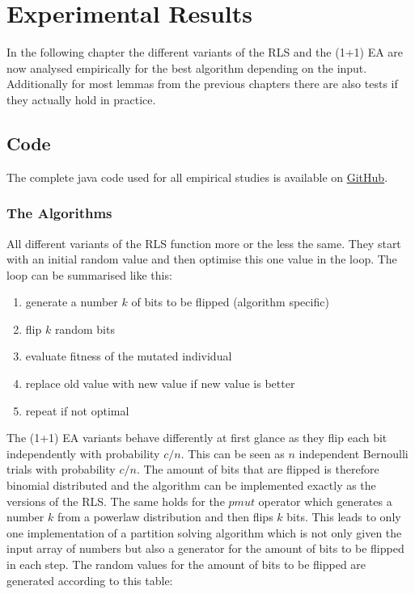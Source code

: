 \chapter{Experimental Results}\label{ch:expRes}

In the following chapter the different variants of the RLS and the (1+1) EA are now analysed empirically for the best algorithm depending on the input.
Additionally for most lemmas from the previous chapters there are also tests if they actually hold in practice.

\section{Code}
The complete java code used for all empirical studies is available on \href{https://github.com/Err404NameNotFound/PartitionSolvingWithEAs}{GitHub}.
\subsection{The Algorithms}
All different variants of the RLS function more or the less the same. They start with an initial random value and then optimise this one value in the loop. The loop can be summarised like this:
\begin{enumerate}
      \item generate a number $k$ of bits to be flipped (algorithm specific)
      \item flip $k$ random bits
      \item evaluate fitness of the mutated individual
      \item replace old value with new value if new value is better
      \item repeat if not optimal
\end{enumerate}
The (1+1) EA variants behave differently at first glance as they flip each bit independently with probability $c/n$.
This can be seen as $n$ independent Bernoulli trials with probability $c/n$.
The amount of bits that are flipped is therefore binomial distributed and the algorithm can be implemented exactly as the versions of the RLS. The same holds for the $pmut$ operator which generates a number $k$ from a powerlaw distribution and then flips $k$ bits.
This leads to only one implementation of a partition solving algorithm which is not only given the input array of numbers but also a generator for the amount of bits to be flipped in each step.
The random values for the amount of bits to be flipped are generated according to this table:

